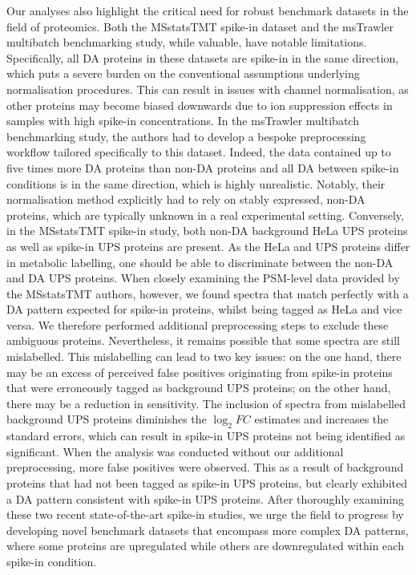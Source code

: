 \documentclass[
  letterpaper,
  DIV=11,
  numbers=noendperiod]{scrartcl}
\begin{document}
Our analyses also highlight the critical need for robust benchmark
datasets in the field of proteomics. Both the MSstatsTMT spike-in
dataset and the msTrawler multibatch benchmarking study, while valuable,
have notable limitations. Specifically, all DA proteins in these
datasets are spike-in in the same direction, which puts a severe burden
on the conventional assumptions underlying normalisation procedures.
This can result in issues with channel normalisation, as other proteins
may become biased downwards due to ion suppression effects in samples
with high spike-in concentrations. In the msTrawler multibatch
benchmarking study, the authors had to develop a bespoke preprocessing
workflow tailored specifically to this dataset. Indeed, the data
contained up to five times more DA proteins than non-DA proteins and all
DA between spike-in conditions is in the same direction, which is highly
unrealistic. Notably, their normalisation method explicitly had to rely
on stably expressed, non-DA proteins, which are typically unknown in a
real experimental setting. Conversely, in the MSstatsTMT spike-in study,
both non-DA background HeLa UPS proteins as well as spike-in UPS
proteins are present. As the HeLa and UPS proteins differ in metabolic
labelling, one should be able to discriminate between the non-DA and DA
UPS proteins. When closely examining the PSM-level data provided by the
MSstatsTMT authors, however, we found spectra that match perfectly with
a DA pattern expected for spike-in proteins, whilst being tagged as HeLa
and vice versa. We therefore performed additional preprocessing steps to
exclude these ambiguous proteins. Nevertheless, it remains possible that
some spectra are still mislabelled. This mislabelling can lead to two
key issues: on the one hand, there may be an excess of perceived false
positives originating from spike-in proteins that were erroneously
tagged as background UPS proteins; on the other hand, there may be a
reduction in sensitivity. The inclusion of spectra from mislabelled
background UPS proteins diminishes the \(\log_2 FC\) estimates and
increases the standard errors, which can result in spike-in UPS proteins
not being identified as significant. When the analysis was conducted
without our additional preprocessing, more false positives were
observed. This as a result of background proteins that had not been
tagged as spike-in UPS proteins, but clearly exhibited a DA pattern
consistent with spike-in UPS proteins. After thoroughly examining these
two recent state-of-the-art spike-in studies, we urge the field to
progress by developing novel benchmark datasets that encompass more
complex DA patterns, where some proteins are upregulated while others
are downregulated within each spike-in condition.
\end{document}
